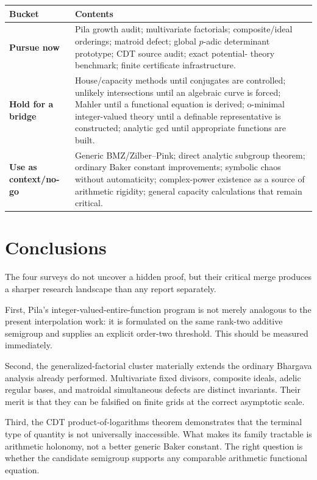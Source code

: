\documentclass[10pt,letterpaper]{article}
\begin{document}
\begin{center}
\small
\begin{tabularx}{0.96\textwidth}{L{0.16\textwidth}Y}
\toprule
Bucket & Contents\\
\midrule
\textbf{Pursue now} & Pila growth audit; multivariate factorials; composite/ideal orderings;
matroid defect; global \(p\)-adic determinant prototype; CDT source audit; exact potential-
theory benchmark; finite certificate infrastructure.\\
\addlinespace
\textbf{Hold for a bridge} & House/capacity methods until conjugates are controlled;
unlikely intersections until an algebraic curve is forced; Mahler until a functional
equation is derived; o-minimal integer-valued theory until a definable representative is
constructed; analytic gcd until appropriate functions are built.\\
\addlinespace
\textbf{Use as context/no-go} & Generic BMZ/Zilber--Pink; direct analytic subgroup theorem;
ordinary Baker constant improvements; symbolic chaos without automaticity; complex-power
existence as a source of arithmetic rigidity; general capacity calculations that remain
critical.\\
\bottomrule
\end{tabularx}
\end{center}

\section{Conclusions}

The four surveys do not uncover a hidden proof, but their critical merge produces a sharper
research landscape than any report separately.

First, Pila's integer-valued-entire-function program is not merely analogous to the present
interpolation work: it is formulated on the same rank-two additive semigroup and supplies an
explicit order-two threshold.  This should be measured immediately.

Second, the generalized-factorial cluster materially extends the ordinary Bhargava analysis
already performed.  Multivariate fixed divisors, composite ideals, adelic regular bases, and
matroidal simultaneous defects are distinct invariants.  Their merit is that they can be
falsified on finite grids at the correct asymptotic scale.

Third, the CDT product-of-logarithms theorem demonstrates that the terminal type of quantity
is not universally inaccessible.  What makes its family tractable is arithmetic holonomy,
not a better generic Baker constant.  The right question is whether the candidate semigroup
supports any comparable arithmetic functional equation.
\end{document}
